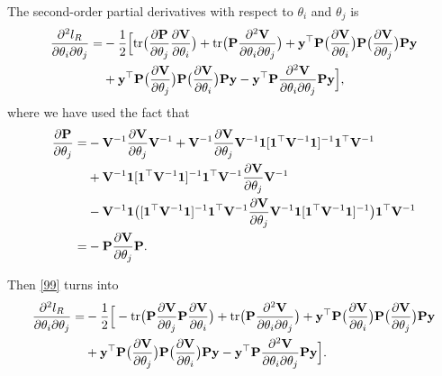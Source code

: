 \documentclass[article]{jss}
\begin{document}
\begin{appendix}
The second-order partial derivatives with respect to $\theta_i$ and $\theta_j$ is 
\begin{align}
\frac{\partial^2 l_R}{\partial \theta_i \partial \theta_j}=&-\frac{1}{2}\Big[\mbox{tr}\big(\frac{\partial {\bf P}}{\partial \theta_j} \frac{\partial {\bf V}}{\partial \theta_i}\big)+\mbox{tr}\big({\bf P} \frac{\partial^2 {\bf V}}{\partial \theta_i \partial \theta_j}\big)+{\bf y}^\top  {\bf P}\big(\frac{\partial {\bf V}}{\partial \theta_i}\big){\bf P} \big(\frac{\partial {\bf V}}{\partial \theta_j}\big){\bf P} {\bf y} \nonumber\\
&+{\bf y}^\top  {\bf P}\big(\frac{\partial {\bf V}}{\partial \theta_j}\big){\bf P} \big(\frac{\partial {\bf V}}{\partial \theta_i}\big){\bf P} {\bf y}-{\bf y}^\top  {\bf P}\frac{\partial^2 {\bf V}}{\partial \theta_i \partial \theta_j}{\bf P} {\bf y} \Big], \label{99}
\end{align}
where we have used the fact that
\begin{align*}
\frac{\partial {\bf P}}{\partial \theta_j}=&-{\bf V}^{-1}\frac{\partial {\bf V}}{\partial \theta_j}{\bf V}^{-1}+{\bf V}^{-1}\frac{\partial {\bf V}}{\partial \theta_j}{\bf V}^{-1}\mathbf{1}[\mathbf{1}^\top {\bf V}^{-1}\mathbf{1}]^{-1}\mathbf{1}^\top {\bf V}^{-1}\\
&+{\bf V}^{-1}\mathbf{1}[\mathbf{1}^\top {\bf V}^{-1}\mathbf{1}]^{-1}\mathbf{1}^\top {\bf V}^{-1}\frac{\partial {\bf V}}{\partial \theta_j}{\bf V}^{-1}\\&-{\bf V}^{-1}\mathbf{1}\big([\mathbf{1}^\top {\bf V}^{-1}\mathbf{1}]^{-1}\mathbf{1}^\top {\bf V}^{-1}\frac{\partial {\bf V}}{\partial \theta_j}{\bf V}^{-1}\mathbf{1}[\mathbf{1}^\top {\bf V}^{-1}\mathbf{1}]^{-1}\big)\mathbf{1}^\top {\bf V}^{-1}\\
=&-{\bf P}\frac{\partial {\bf V}}{\partial \theta_j}{\bf P}.
\end{align*}

Then \eqref{99} turns into 
\begin{align}
\frac{\partial^2 l_R}{\partial \theta_i \partial \theta_j}=&-\frac{1}{2}\Big[-\mbox{tr}\big({\bf P} \frac{\partial {\bf V}}{\partial \theta_j}{\bf P} \frac{\partial {\bf V}}{\partial \theta_i}\big)+\mbox{tr}\big({\bf P} \frac{\partial^2 {\bf V}}{\partial \theta_i \partial \theta_j}\big)+{\bf y}^\top  {\bf P}\big(\frac{\partial {\bf V}}{\partial \theta_i}\big){\bf P} \big(\frac{\partial {\bf V}}{\partial \theta_j}\big){\bf P} {\bf y} \nonumber\\
&+{\bf y}^\top  {\bf P}\big(\frac{\partial {\bf V}}{\partial \theta_j}\big){\bf P} \big(\frac{\partial {\bf V}}{\partial \theta_i}\big){\bf P} {\bf y}-{\bf y}^\top  {\bf P}\frac{\partial^2 {\bf V}}{\partial \theta_i \partial \theta_j}{\bf P} {\bf y} \Big]. \label{ss}
\end{align}


\end{appendix}
\end{document}
